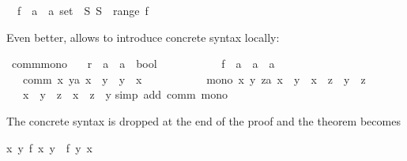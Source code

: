\begin{isabellebody}
\isamarkuptrue%
\ \ f\ {\isacharcolon}{\isacharcolon}\ {\isachardoublequote}{\isacharprime}a\ {\isasymRightarrow}\ {\isacharprime}a\ set{\isachardoublequote}\ \ {\isachardoublequote}{\isasymexists}S{\isachardot}\ S\ {\isasymnotin}\ range\ f{\isachardoublequote}\isamarkupfalse%
\isamarkupfalse%
%
\begin{isamarkuptext}%
\noindent
Even better,  allows to introduce concrete syntax locally:%
\end{isamarkuptext}%
\isamarkuptrue%
\ comm{\isacharunderscore}mono{\isacharcolon}\isanewline
\ \ \ r\ {\isacharcolon}{\isacharcolon}\ {\isachardoublequote}{\isacharprime}a\ {\isasymRightarrow}\ {\isacharprime}a\ {\isasymRightarrow}\ bool{\isachardoublequote}\ {\isacharparenleft}\ {\isachardoublequote}{\isachargreater}{\isachardoublequote}\ {}{}{\isacharparenright}\ \isanewline
\ \ \ \ \ \ \ f\ {\isacharcolon}{\isacharcolon}\ {\isachardoublequote}{\isacharprime}a\ {\isasymRightarrow}\ {\isacharprime}a\ {\isasymRightarrow}\ {\isacharprime}a{\isachardoublequote}\ \ \ {\isacharparenleft}\ {\isachardoublequote}{\isacharplus}{\isacharplus}{\isachardoublequote}\ {}{}{\isacharparenright}\isanewline
\ \ \ comm{\isacharcolon}\ {\isachardoublequote}{\isasymAnd}x\ y{\isacharcolon}{\isacharcolon}{\isacharprime}a{\isachardot}\ x\ {\isacharplus}{\isacharplus}\ y\ {\isacharequal}\ y\ {\isacharplus}{\isacharplus}\ x{\isachardoublequote}\ \isanewline
\ \ \ \ \ \ \ \ \ \ mono{\isacharcolon}\ {\isachardoublequote}{\isasymAnd}x\ y\ z{\isacharcolon}{\isacharcolon}{\isacharprime}a{\isachardot}\ x\ {\isachargreater}\ y\ {\isasymLongrightarrow}\ x\ {\isacharplus}{\isacharplus}\ z\ {\isachargreater}\ y\ {\isacharplus}{\isacharplus}\ z{\isachardoublequote}\isanewline
\ \ \ {\isachardoublequote}x\ {\isachargreater}\ y\ {\isasymLongrightarrow}\ z\ {\isacharplus}{\isacharplus}\ x\ {\isachargreater}\ z\ {\isacharplus}{\isacharplus}\ y{\isachardoublequote}\isanewline
\isamarkupfalse%
simp\ add{\isacharcolon}\ comm\ mono{\isacharparenright}\isamarkupfalse%
%
\begin{isamarkuptext}%
\noindent The concrete syntax is dropped at the end of the proof and the
theorem becomes \begin{isabelle}%
{\isasymlbrakk}{\isasymAnd}x\ y{\isachardot}\ {\isacharquery}f\ x\ y\ {\isacharequal}\ {\isacharquery}f\ y\ x{\isacharsemicolon}\isanewline

\end{isabelle}
\end{isamarkuptext}
\end{isabellebody}
